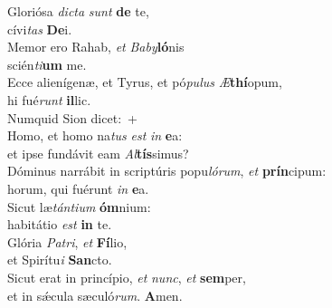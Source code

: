 \evenverse Gloriósa \textit{di}\textit{cta} \textit{sunt} \textbf{de} te,~\*\\
\evenverse cívi\textit{tas} \textbf{De}i.\\
\oddverse Memor ero Rahab, \textit{et} \textit{Ba}\textit{by}\textbf{ló}nis~\*\\
\oddverse scién\textit{ti}\textbf{um} me.\\
\evenverse Ecce alienígenæ, et Tyrus, et pó\textit{pu}\textit{lus} \textit{Æ}\textbf{thí}opum,~\*\\
\evenverse hi fué\textit{runt} \textbf{il}lic.\\
\oddverse Numquid Sion dicet:~+\\
\oddverse  Homo, et homo na\textit{tus} \textit{est} \textit{in} \textbf{e}a:~\*\\
\oddverse et ipse fundávit eam \textit{Al}\textbf{tís}simus?\\
\evenverse Dóminus narrábit in scriptúris popu\textit{ló}\textit{rum}, \textit{et} \textbf{prín}cipum:~\*\\
\evenverse horum, qui fuérunt \textit{in} \textbf{e}a.\\
\oddverse Sicut læ\textit{tán}\textit{ti}\textit{um} \textbf{óm}nium:~\*\\
\oddverse habitátio \textit{est} \textbf{in} te.\\
\evenverse Glória \textit{Pa}\textit{tri}, \textit{et} \textbf{Fí}lio,~\*\\
\evenverse et Spirítu\textit{i} \textbf{San}cto.\\
\oddverse Sicut erat in princípio, \textit{et} \textit{nunc}, \textit{et} \textbf{sem}per,~\*\\
\oddverse et in sǽcula sæculó\textit{rum}. \textbf{A}men.\\
